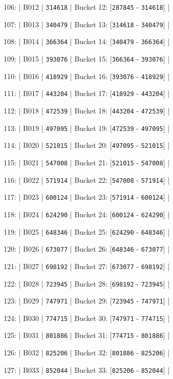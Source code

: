 \documentclass[11pt,a4paper]{article}
\begin{document}
106: | B012 | \texttt{314618} | Bucket 12: [\texttt{287845} - \texttt{314618}] |

107: | B013 | \texttt{340479} | Bucket 13: [\texttt{314618} - \texttt{340479}] |

108: | B014 | \texttt{366364} | Bucket 14: [\texttt{340479} - \texttt{366364}] |

109: | B015 | \texttt{393076} | Bucket 15: [\texttt{366364} - \texttt{393076}] |

110: | B016 | \texttt{418929} | Bucket 16: [\texttt{393076} - \texttt{418929}] |

111: | B017 | \texttt{443204} | Bucket 17: [\texttt{418929} - \texttt{443204}] |

112: | B018 | \texttt{472539} | Bucket 18: [\texttt{443204} - \texttt{472539}] |

113: | B019 | \texttt{497095} | Bucket 19: [\texttt{472539} - \texttt{497095}] |

114: | B020 | \texttt{521015} | Bucket 20: [\texttt{497095} - \texttt{521015}] |

115: | B021 | \texttt{547008} | Bucket 21: [\texttt{521015} - \texttt{547008}] |

116: | B022 | \texttt{571914} | Bucket 22: [\texttt{547008} - \texttt{571914}] |

117: | B023 | \texttt{600124} | Bucket 23: [\texttt{571914} - \texttt{600124}] |

118: | B024 | \texttt{624290} | Bucket 24: [\texttt{600124} - \texttt{624290}] |

119: | B025 | \texttt{648346} | Bucket 25: [\texttt{624290} - \texttt{648346}] |

120: | B026 | \texttt{673077} | Bucket 26: [\texttt{648346} - \texttt{673077}] |

121: | B027 | \texttt{698192} | Bucket 27: [\texttt{673077} - \texttt{698192}] |

122: | B028 | \texttt{723945} | Bucket 28: [\texttt{698192} - \texttt{723945}] |

123: | B029 | \texttt{747971} | Bucket 29: [\texttt{723945} - \texttt{747971}] |

124: | B030 | \texttt{774715} | Bucket 30: [\texttt{747971} - \texttt{774715}] |

125: | B031 | \texttt{801886} | Bucket 31: [\texttt{774715} - \texttt{801886}] |

126: | B032 | \texttt{825206} | Bucket 32: [\texttt{801886} - \texttt{825206}] |

127: | B033 | \texttt{852044} | Bucket 33: [\texttt{825206} - \texttt{852044}] |
\end{document}
